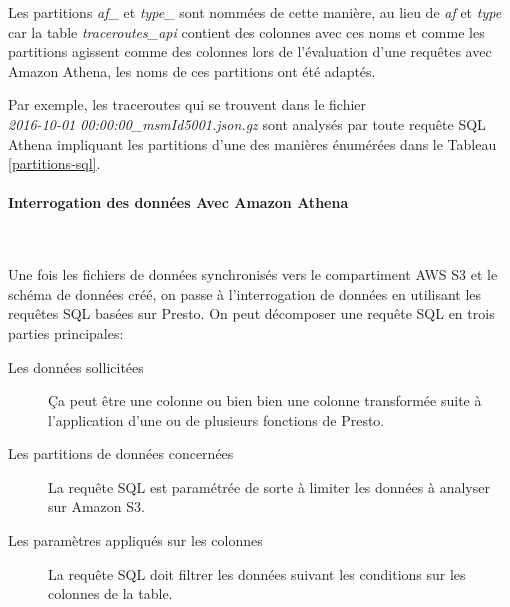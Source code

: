Les   partitions \textit{af\_} et \textit{type\_} sont nommées de cette manière, au lieu de \textit{af} et \textit{type} car  la table \textit{traceroutes\_api} contient des colonnes avec ces noms et comme les partitions agissent comme des colonnes  lors de l'évaluation d'une requêtes avec Amazon Athena, les noms de ces partitions ont été adaptés.

Par exemple, les traceroutes qui se trouvent dans  le fichier\\
\textit{2016-10-01 00:00:00\_msmId5001.json.gz} sont analysés par toute requête SQL Athena  
impliquant les partitions d'une des manières énumérées dans le Tableau \ref{partitions-sql}.

\begin{table}[H]
\caption{Exemple d'utilisation des partitions dans une requête SQL dans Amazon Athena}
\label{partitions-sql}
\end{table}
\paragraph{Interrogation des données Avec Amazon Athena}~  \label{sql-athena-request}

Une fois les fichiers de données  synchronisés vers le compartiment AWS S3 et le schéma  de données  créé, on passe à l'interrogation de données en utilisant les requêtes SQL basées sur Presto.  On peut décomposer une requête SQL en trois parties principales:

\begin{description}
	\item[Les données sollicitées] Ça peut être une colonne ou bien bien une colonne transformée suite à l'application d'une ou de plusieurs fonctions de Presto.
	\item[Les partitions de données concernées] La requête SQL est paramétrée de sorte à limiter les données à analyser sur Amazon S3. 
	\item[Les paramètres appliqués sur les colonnes] La requête SQL doit filtrer les données suivant les conditions sur les colonnes de la table.
\end{description}


